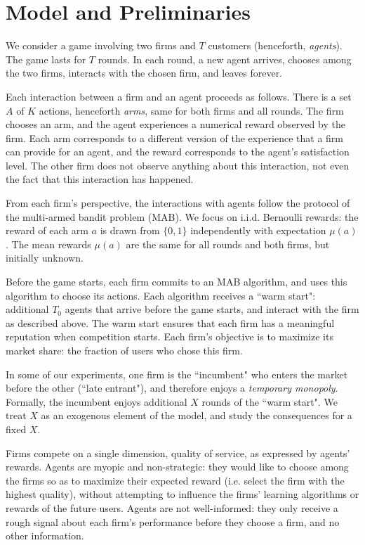 \documentclass[../competing_bandits.tex]{subfiles}
\begin{document}
\section{Model and Preliminaries}\label{sec:model}

We consider a game involving two firms and $T$ customers (henceforth, \emph{agents}). The game lasts for $T$ rounds. In each round, a new agent arrives, chooses among the two firms, interacts with the chosen firm, and leaves forever.

Each interaction between a firm and an agent proceeds as follows. There is a set $A$ of $K$ actions, henceforth \emph{arms}, same for both firms and all rounds. The firm chooses an arm, and the agent experiences a numerical reward observed by the firm. Each arm corresponds to a different version of the experience that a firm can provide for an agent, and the reward corresponds to the agent's satisfaction level. The other firm does not observe anything about this interaction, not even the fact that this interaction has happened.

From each firm's perspective, the interactions with agents follow the protocol of the multi-armed bandit problem (MAB). We focus on i.i.d. Bernoulli rewards: the  reward of each arm $a$ is drawn from $\{0,1\}$ independently with expectation $\mu(a)$. The mean rewards $\mu(a)$ are the same for all rounds and both firms, but initially unknown.

Before the game starts, each firm commits to an MAB algorithm, and uses this algorithm to choose its actions. Each algorithm receives a ``warm start": additional $T_0$ agents that arrive before the game starts, and interact with the firm as described above. The warm start ensures that each firm has a meaningful reputation when competition starts. Each firm's objective is to maximize its market share: the fraction of users who chose this firm.

In some of our experiments, one firm is the ``incumbent" who enters the market before the other (``late entrant"), and therefore enjoys a \emph{temporary monopoly}. Formally, the incumbent enjoys additional $X$ rounds of the ``warm start". We treat $X$ as an exogenous element of the model, and study the consequences for a fixed $X$.



Firms compete on a single dimension, quality of service, as expressed by agents' rewards. 
Agents are myopic and non-strategic: they would like to choose among the firms so as to maximize their expected reward (i.e. select the firm with the highest quality), without attempting to influence the firms' learning algorithms or rewards of the future users. Agents are not well-informed: they only receive a rough signal about each firm's performance before they choose a firm, and no other information.
\end{document}
